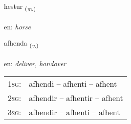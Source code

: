 \documentclass[frontgrid, backgrid]{flacards}\usepackage[]{graphicx}\usepackage[]{color}
\begin{document}
\renewcommand{\flhead}{\vskip5pt \fboxsep=0pt {\small\bfseries\footnotesize Nafnorð | Noun}}
\renewcommand{\fcfoot}{\vskip5pt \fboxsep=0pt \hspace{2pt}{\small\bfseries\footnotesize 2K}}

\renewcommand{\blhead}{\vskip5pt {\small\bfseries\footnotesize Nafnorð | Noun }}
\renewcommand{\bcfoot}{\vskip5pt \hspace{2pt}{\small\bfseries\footnotesize 2K}}


{hestur \small{\textsubscript{(\textit{m.})}} \\[1ex] %
\textphonetic{[hɛstʏr]} \\
en: \emph{horse} \\  [2ex]
\renewcommand*{\arraystretch}{0.8}
}

\renewcommand{\flhead}{\vskip5pt \fboxsep=0pt {\small\bfseries\footnotesize Sagnorð | Verb}}
\renewcommand{\fcfoot}{\vskip5pt \fboxsep=0pt \hspace{2pt}{\small\bfseries\footnotesize 2K}}

\renewcommand{\blhead}{\vskip5pt {\small\bfseries\footnotesize Sagnorð | Verb }}
\renewcommand{\bcfoot}{\vskip5pt \hspace{2pt}{\small\bfseries\footnotesize 2K}}


{afhenda \small{\textsubscript{(\textit{v.})}} \\[1ex] %
\textphonetic{[afhɛnta]} \\
en: \emph{deliver, handover} \\  [2ex]
\renewcommand*{\arraystretch}{0.8}
\begin{tabular}{p{1cm}l}
\textsc{1sg}: & afhendi -- afhenti -- afhent \\ 
\textsc{2sg}: & afhendir -- afhentir -- afhent \\ 
\textsc{3sg}: & afhendir -- afhenti -- afhent \\ 
\end{tabular}
}
\end{document}

